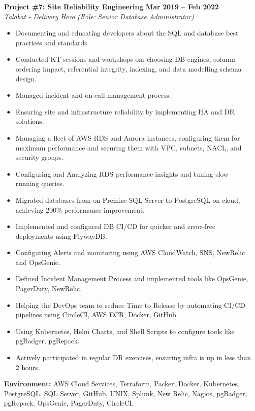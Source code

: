 \documentclass[10pt,a4paper]{article}
\begin{document}
\noindent
\begin{minipage}{\textwidth}
    \textbf{\large Project \#7: Site Reliability Engineering} \hfill \textbf{Mar 2019 -- Feb 2022} \\
    \textit{Talabat - Delivery Hero (Role: Senior Database Administrator)}
    \begin{itemize}[leftmargin=*, noitemsep, topsep=2pt]
        \item Documenting and educating developers about the SQL and database best practices and standards.
        \item Conducted KT sessions and workshops on: choosing DB engines, column ordering impact, referential integrity, indexing, and data modelling schema design.
        \item Managed incident and on-call management process.
        \item Ensuring site and infrastructure reliability by implementing HA and DR solutions.
        \item Managing a fleet of AWS RDS and Aurora instances, configuring them for maximum performance and securing them with VPC, subnets, NACL, and security groups.
        \item Configuring and Analyzing RDS performance insights and tuning slow-running queries.
        \item Migrated databases from on-Premise SQL Server to PostgreSQL on cloud, achieving 200\% performance improvement.
        \item Implemented and configured DB CI/CD for quicker and error-free deployments using FlywayDB.
        \item Configuring Alerts and monitoring using AWS CloudWatch, SNS, NewRelic and OpsGenie.
        \item Defined Incident Management Process and implemented tools like OpsGenie, PagerDuty, NewRelic.
        \item Helping the DevOps team to reduce Time to Release by automating CI/CD pipelines using CircleCI, AWS ECR, Docker, GitHub.
        \item Using Kubernetes, Helm Charts, and Shell Scripts to configure tools like pgBadger, pgRepack.
        \item Actively participated in regular DR exercises, ensuring infra is up in less than 2 hours.
    \end{itemize}
    \small{\textbf{Environment:} AWS Cloud Services, Terraform, Packer, Docker, Kubernetes, PostgreSQL, SQL Server, GitHub, UNIX, Splunk, New Relic, Nagios, pgBadger, pgRepack, OpsGenie, PagerDuty, CircleCI.}
\end{minipage}
\vspace{10pt}
\end{document}
